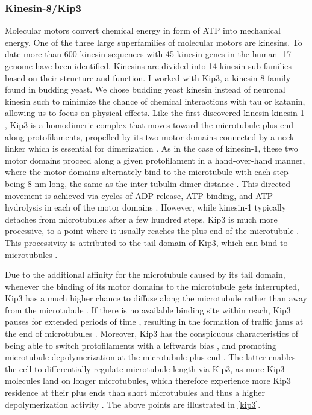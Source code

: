 \subsubsection{Kinesin-8/Kip3}
\label{sec:kip3_intro}
Molecular motors convert chemical energy in form of ATP into mechanical energy. One of the three large superfamilies of molecular motors are kinesins. To date more than 600 kinesin sequences with 45 kinesin genes in the human- 17 -genome \parencite{Endow3420} have been identified. Kinesins are divided into 14 kinesin sub-families based on their structure and function. I worked with Kip3, a kinesin-8 family found in budding yeast. We chose budding yeast kinesin instead of neuronal kinesin such to minimize the chance of chemical interactions with tau or katanin, allowing us to focus on physical effects. Like the first discovered kinesin kinesin-1 \parencite{Endow3420}, Kip3 is a homodimeric complex that moves toward the microtubule plus-end along protofilaments, propelled by its two motor domains connected by a neck linker which is essential for dimerization \parencite{Lin2020}. As in the case of kinesin-1, these two motor domains proceed along a given protofilament in a hand-over-hand manner, where the motor domains alternately bind to the microtubule with each step being 8 nm long, the same as the inter-tubulin-dimer distance \parencite{Xie2021}. This directed movement is achieved via cycles of ADP release, ATP binding, and ATP hydrolysis in each of the motor domains \parencite{Xie2021}. However, while kinesin-1 typically detaches from microtubules after a few hundred steps, Kip3 is much more processive, to a point where it usually reaches the plus end of the microtubule \parencite{Varga2009}. This processivity is attributed to the tail domain of Kip3, which can bind to microtubules \parencite{SU2011751}.\par

Due to the additional affinity for the microtubule caused by its tail domain, whenever the binding of its motor domains to the microtubule gets interrupted, Kip3 has a much higher chance to diffuse along the microtubule rather than away from the microtubule \parencite{Xie2021}. If there is no available binding site within reach, Kip3 pauses for extended periods of time \parencite{Varga2009}, resulting in the formation of traffic jams at the end of microtubules \parencite{Leduc2012}. Moreover, Kip3 has the conspicuous characteristics of being able to switch protofilaments with a leftwards bias \parencite{Bormuth2012}, and promoting microtubule depolymerization at the microtubule plus end \parencite{Lin2020}. The latter enables the cell to differentially regulate microtubule length via Kip3, as more Kip3 molecules land on longer microtubules, which therefore experience more Kip3 residence at their plus ends than short microtubules and thus a higher depolymerization activity \parencite{Varga2009}. The above points are illustrated in \autoref{kip3}.\par

